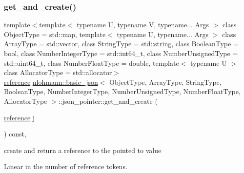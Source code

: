 \subsubsection{\texorpdfstring{get\+\_\+and\+\_\+create()}{get\_and\_create()}}
{\footnotesize\ttfamily template$<$template$<$ typename U, typename V, typename... Args $>$ class Object\+Type = std\+::map, template$<$ typename U, typename... Args $>$ class Array\+Type = std\+::vector, class String\+Type  = std\+::string, class Boolean\+Type  = bool, class Number\+Integer\+Type  = std\+::int64\+\_\+t, class Number\+Unsigned\+Type  = std\+::uint64\+\_\+t, class Number\+Float\+Type  = double, template$<$ typename U $>$ class Allocator\+Type = std\+::allocator$>$ \\
\hyperlink{classnlohmann_1_1basic__json_a3ec8e17be8732fe436e9d6733f52b7a3}{reference} \hyperlink{classnlohmann_1_1basic__json}{nlohmann\+::basic\+\_\+json}$<$ Object\+Type, Array\+Type, String\+Type, Boolean\+Type, Number\+Integer\+Type, Number\+Unsigned\+Type, Number\+Float\+Type, Allocator\+Type $>$\+::json\+\_\+pointer\+::get\+\_\+and\+\_\+create (\begin{DoxyParamCaption}\item[{\hyperlink{classnlohmann_1_1basic__json_a3ec8e17be8732fe436e9d6733f52b7a3}{reference}}]{j }\end{DoxyParamCaption}) const\hspace{0.3cm}{\ttfamily [inline]}, {\ttfamily [private]}}



create and return a reference to the pointed to value 

Linear in the number of reference tokens. \hypertarget{classnlohmann_1_1basic__json_1_1json__pointer_a667ff8c80386a8f5b1f75966e7355c07}{}\label{classnlohmann_1_1basic__json_1_1json__pointer_a667ff8c80386a8f5b1f75966e7355c07} 
